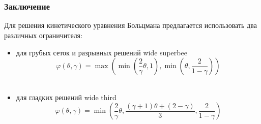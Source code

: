 \documentclass[ucs]{beamer}
\begin{document}
\section*{}
\begin{frame}
	\frametitle{Заключение}
	Для решения кинетического уравнения Больцмана предлагается использовать два различных ограничителя:
	\begin{itemize}
		\item для \alert{грубых} сеток и \alert{разрывных} решений \alert{wide superbee}
			\[ \varphi(\theta,\gamma) = \max\left(\min\left(\dfrac2{\gamma}\theta,1\right),\min\left(\theta,\dfrac2{1-\gamma}\right)\right) \] \\
		\item для \alert{гладких} решений \alert{wide third} 
			\[ \varphi(\theta,\gamma) = \min\left(\dfrac2{\gamma}\theta,\dfrac{(\gamma+1)\theta+(2-\gamma)}{3},\dfrac2{1-\gamma}\right) \] \\
	\end{itemize}

\end{frame}
\end{document}
